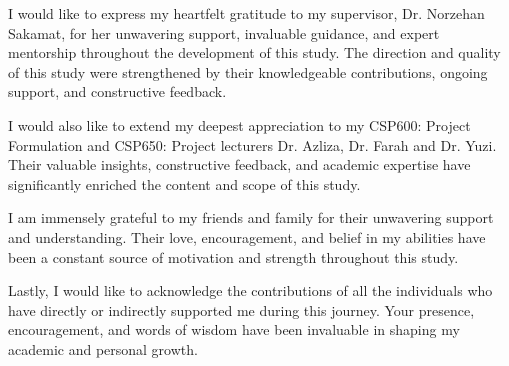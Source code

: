 \begin{acknowledgement}
I would like to express my heartfelt gratitude to my supervisor, Dr. Norzehan Sakamat, for her unwavering support, invaluable guidance, and expert mentorship throughout the development of this study. The direction and quality of this study were strengthened by their knowledgeable contributions, ongoing support, and constructive feedback.

I would also like to extend my deepest appreciation to my CSP600: Project Formulation and CSP650: Project lecturers Dr. Azliza, Dr. Farah and Dr. Yuzi. Their valuable insights, constructive feedback, and academic expertise have significantly enriched the content and scope of this study.
    
I am immensely grateful to my friends and family for their unwavering support and understanding. Their love, encouragement, and belief in my abilities have been a constant source of motivation and strength throughout this study.
    
Lastly, I would like to acknowledge the contributions of all the individuals who have directly or indirectly supported me during this journey. Your presence, encouragement, and words of wisdom have been invaluable in shaping my academic and personal growth.
\end{acknowledgement}

